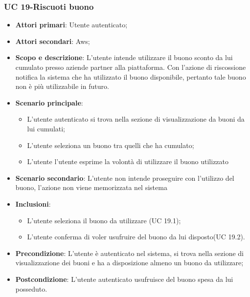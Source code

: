     \subsubsection{UC 19-Riscuoti buono}  
      \begin{itemize}
        \item \textbf{Attori primari}: Utente autenticato;
        \item \textbf{Attori secondari}: Aws;
        \item \textbf{Scopo e descrizione}: L'utente intende utilizzare il buono sconto da lui cumulato presso aziende partner alla piattaforma. Con l'azione di riscossione notifica la sistema che ha utilizzato il buono disponibile, pertanto tale buono non è più utilizzabile in futuro.
        \item \textbf{Scenario principale}:
            \begin{itemize}
                \item L'utente autenticato si trova nella sezione di visualizzazione da buoni da lui cumulati;
                \item L'utente seleziona un buono tra quelli che ha cumulato;
                \item L'utente l'utente esprime la volontà di utilizzare il buono utilizzato
                
            \end{itemize}
            
        \item \textbf{Scenario secondario}: L'utente non intende proseguire con l'utilizzo del buono, l'azione non viene memorizzata nel sistema
         \item \textbf{Inclusioni}:
            \begin{itemize}
                \item L'utente seleziona il buono da utilizzare (UC 19.1);
                \item L'utente conferma di voler usufruire del buono da lui disposto(UC 19.2).
            \end{itemize}
          
        \item \textbf{Precondizione}: L'utente è autenticato nel sistema, si trova nella sezione di visualizzazione dei buoni e ha a disposizione almeno un buono da utilizzare;
        \item \textbf{Postcondizione}: L'utente autenticato usufruisce del buono spesa da lui posseduto.
        \end{itemize}  
        

